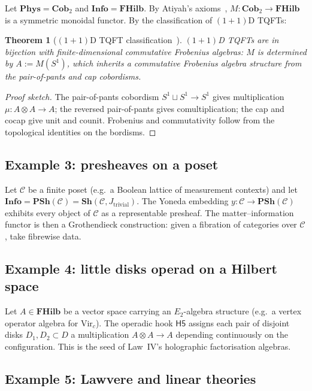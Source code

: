 \documentclass[12pt]{article}
\newtheorem{theorem}{Theorem}[section]
\theoremstyle{definition}
\theoremstyle{remark}
\newcommand{\C}{\mathcal{C}}
\newcommand{\Phys}{\mathbf{Phys}}
\newcommand{\Info}{\mathbf{Info}}
\newcommand{\FHilb}{\mathbf{FHilb}}
\newcommand{\Cob}{\mathbf{Cob}}
\begin{document}
Let $\Phys = \Cob_2$ and $\Info = \FHilb$. By Atiyah's axioms~\cite{atiyah1988}, $M : \Cob_2 \to \FHilb$ is a symmetric monoidal functor. By the classification of $(1+1)$D TQFTs:

\begin{theorem}[$(1+1)$D TQFT classification~\cite{atiyah1988,baezstay2009}]
\label{thm:11d-tqft}
$(1+1)$D TQFTs are in bijection with finite-dimensional commutative Frobenius algebras: $M$ is determined by $A := M(S^1)$, which inherits a commutative Frobenius algebra structure from the pair-of-pants and cap cobordisms.
\end{theorem}

\begin{proof}[Proof sketch]
The pair-of-pants cobordism $S^1 \sqcup S^1 \to S^1$ gives multiplication $\mu : A \otimes A \to A$; the reversed pair-of-pants gives comultiplication; the cap and cocap give unit and counit. Frobenius and commutativity follow from the topological identities on the bordisms.
\end{proof}

\subsection{Example 3: presheaves on a poset}

Let $\C$ be a finite poset (e.g.\ a Boolean lattice of measurement contexts) and let $\Info = \mathbf{PSh}(\C) = \mathbf{Sh}(\C, J_{\mathrm{trivial}})$. The Yoneda embedding $y : \C \to \mathbf{PSh}(\C)$ exhibits every object of $\C$ as a representable presheaf. The matter--information functor is then a Grothendieck construction: given a fibration of categories over $\C$, take fibrewise data.

\subsection{Example 4: little disks operad on a Hilbert space}

Let $A \in \FHilb$ be a vector space carrying an $E_2$-algebra structure (e.g.\ a vertex operator algebra for $\mathrm{Vir}_c$). The operadic hook $\mathsf{H5}$ assigns each pair of disjoint disks $D_1, D_2 \subset D$ a multiplication $A \otimes A \to A$ depending continuously on the configuration. This is the seed of Law~IV's holographic factorisation algebras.

\subsection{Example 5: Lawvere and linear theories}
\end{document}
